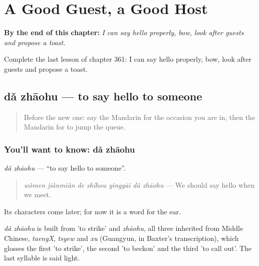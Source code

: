 
\chapter{A Good Guest, a Good Host}
\label{ch:zh-a-good-guest-a-good-host}

\begin{chapteropening}
\textbf{By the end of this chapter:} \emph{I can say hello properly, bow, look after guests and propose a toast.}

Complete the last lesson of chapter 361: I can say hello properly, bow, look after guests and propose a toast.
\end{chapteropening}

\section[dǎ zhāohu]{dǎ zhāohu — to say hello to someone}

\label{lesson:ZH-C361-dazhaohu}



\begin{quote}
Before the new one: say the Mandarin for the occasion you are in, then the Mandarin for to jump the queue.
\end{quote}

\subsection*{You'll want to know: dǎ zhāohu}
\emph{dǎ zhāohu} — \textquotedblleft{}to say hello to someone\textquotedblright{}.

\begin{quote}
\emph{wǒmen jiànmiàn de shíhou yīnggāi dǎ zhāohu} — We should say hello when we meet.
\end{quote}

Its characters come later; for now it is a word for the ear.

\begin{cousinweb}
\emph{dǎ zhāohu} is built from  'to strike' and \emph{zhāohu}, all three inherited from Middle Chinese, \emph{taengX}, \emph{tsyew} and \emph{xu} (Guangyun, in Baxter's transcription), which glosses the first 'to strike', the second 'to beckon' and the third 'to call out'. The last syllable is said light.
\end{cousinweb}

